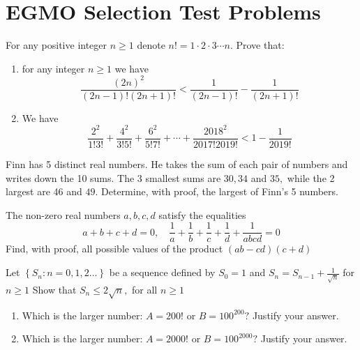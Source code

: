 \documentclass{pset}
\begin{document}
\section*{EGMO Selection Test Problems}

\begin{problems}

\begin{problem}
    For any positive integer \(n \geq 1\) denote \(n !=1 \cdot 2 \cdot 3 \cdots n .\) Prove that:
    \begin{enumerate}
        \item for any integer \(n \geq 1\) we have
        $$
        \frac{(2 n)^{2}}{(2 n-1) !(2 n+1) !}<\frac{1}{(2 n-1) !}-\frac{1}{(2 n+1) !}
        $$
        \item We have
        $$
        \frac{2^{2}}{1 ! 3 !}+\frac{4^{2}}{3 ! 5 !}+\frac{6^{2}}{5 ! 7 !}+\cdots+\frac{2018^{2}}{2017 ! 2019 !}<1-\frac{1}{2019 !}
        $$
    \end{enumerate}
    
\end{problem}

\begin{problem}
    Finn has 5 distinct real numbers. He takes the sum of each pair of numbers and writes down the 10 sums. The 3 smallest sums are \(30,34\) and \(35,\) while the 2 largest are 46 and \(49 .\)
    Determine, with proof, the largest of Finn's 5 numbers.
\end{problem}

\begin{problem}
    The non-zero real numbers \(a, b, c, d\) satisfy the equalities
    $$
    a+b+c+d=0, \quad \frac{1}{a}+\frac{1}{b}+\frac{1}{c}+\frac{1}{d}+\frac{1}{a b c d}=0
    $$
    Find, with proof, all possible values of the product \((a b-c d)(c+d)\)
\end{problem}

\begin{problem}
    Let \(\left\{S_{n}: n=0,1,2 \ldots\right\}\) be a sequence defined by \(S_{0}=1\) and \(S_{n}=S_{n-1}+\frac{1}{\sqrt{n}}\) for \(n \geq 1\) Show that \(S_{n} \leq 2 \sqrt{n},\) for all \(n \geq 1\)
\end{problem}

\begin{problem}
    \begin{enumerate}
        \item Which is the larger number: \(A=200 !\) or \(B=100^{200} ?\) Justify your answer.
        \item Which is the larger number: \(A=2000 !\) or \(B=100^{2000} ?\) Justify your answer.
    \end{enumerate}
\end{problem}


\end{problems}
\end{document}
